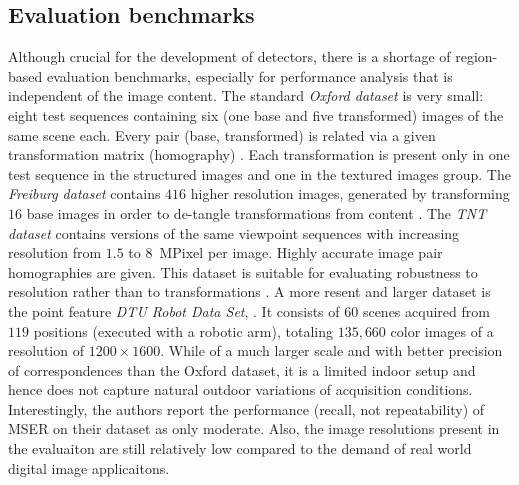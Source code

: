 \documentclass[conference,compsoc]{IEEEtran}
\begin{document}
\subsection{Evaluation benchmarks}
Although crucial for the development of detectors, there is a shortage of region-based evaluation benchmarks, especially for performance analysis that is independent of the image content.  The standard {\em Oxford dataset} is very small: eight test sequences containing six (one base and five transformed) images of the same scene each. Every pair (base, transformed) is related via a given transformation matrix (homography) \cite{Mikolajczyk:2005}.  Each transformation is present only in one test sequence in the structured images and one in the textured images group. The {\em Freiburg dataset} contains $416$ higher resolution images, generated by transforming $16$ base images in order to de-tangle transformations from content \cite{FischerDB14}.  
The {\em TNT dataset} contains versions of the same viewpoint sequences with increasing resolution from $1.5$ to $8$~MPixel per image. Highly accurate image pair homographies are given. This dataset is suitable for evaluating robustness to resolution rather than to transformations \cite{CorRos2013}.  A more resent and larger dataset is the point feature {\em DTU Robot Data Set}, \cite{AanaesDP12}. It  consists of $60$ scenes acquired from $119$ positions (executed with a robotic arm), totaling $135, 660$ color images of a resolution of $1200 \times 1600$. While of a much larger scale and with better precision of correspondences than the Oxford dataset, it is a limited indoor setup and hence does not capture natural outdoor variations of acquisition conditions. Interestingly, the authors report the performance (recall, not repeatability) of MSER on their dataset as only moderate. Also, the image resolutions present in the evaluaiton are still relatively low compared to the demand of real world digital image applicaitons. 
\end{document}
